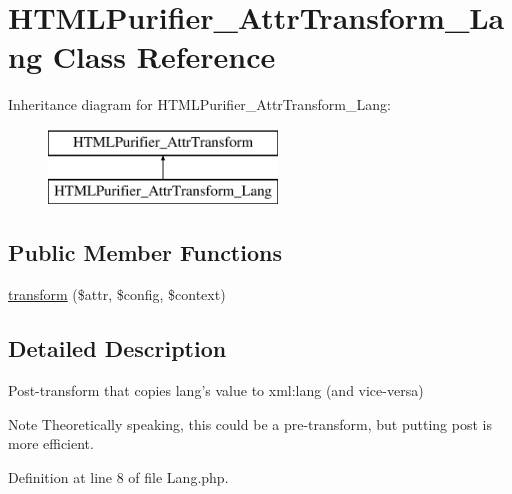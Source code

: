 \hypertarget{classHTMLPurifier__AttrTransform__Lang}{\section{H\+T\+M\+L\+Purifier\+\_\+\+Attr\+Transform\+\_\+\+Lang Class Reference}
\label{classHTMLPurifier__AttrTransform__Lang}
}
Inheritance diagram for H\+T\+M\+L\+Purifier\+\_\+\+Attr\+Transform\+\_\+\+Lang\+:\begin{figure}[H]
\begin{center}
\leavevmode
\includegraphics[height=2.000000cm]{classHTMLPurifier__AttrTransform__Lang}
\end{center}
\end{figure}
\subsection*{Public Member Functions}
\begin{DoxyCompactItemize}
\item 
\hyperlink{classHTMLPurifier__AttrTransform__Lang_ab37119edfaf851d3ea244bb25d32631a}{transform} (\$attr, \$config, \$context)
\end{DoxyCompactItemize}


\subsection{Detailed Description}
Post-\/transform that copies lang's value to xml\+:lang (and vice-\/versa) \begin{DoxyNote}{Note}
Theoretically speaking, this could be a pre-\/transform, but putting post is more efficient. 
\end{DoxyNote}


Definition at line 8 of file Lang.\+php.



